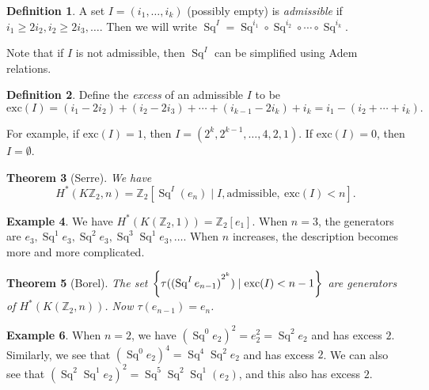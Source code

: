 \documentclass[leqno, openany]{memoir}
\newtheorem{thm}{Theorem}[section]
\theoremstyle{definition}
\newtheorem{defn}[thm]{Definition}
\newtheorem{exm}[thm]{Example}
\theoremstyle{remark}
\theoremstyle{plain}
\theoremstyle{definition}
\theoremstyle{remark}
\newcommand{\Z}{\mathbb{Z}}
\newcommand{\mr}[1]{\mathrm{#1}}
\DeclareMathOperator{\Sq}{Sq}
\begin{document}
\begin{defn}
    A set $I = (i_1, \ldots, i_k)$ (possibly empty) is \textit{admissible} if $i_1 \geq 2 i_2, i_2 \geq 2 i_3, \ldots$. Then we will write $\Sq^I = \Sq^{i_1} \circ \Sq^{i_2} \circ \cdots \circ \Sq^{i_k}$.
\end{defn}

Note that if $I$ is not admissible, then $\Sq^I$ can be simplified using Adem relations.

\begin{defn}
    Define the \textit{excess} of an admissible $I$ to be 
    \[ \mr{exc}(I) = (i_1 - 2 i_2) + (i_2 - 2 i_3) + \cdots + (i_{k-1} - 2 i_k) + i_k = i_1 - (i_2 + \cdots + i_k). \]
\end{defn}

For example, if $\mr{exc}(I) = 1$, then $I = (2^k, 2^{k-1}, \ldots, 4, 2, 1)$. If $\mr{exc}(I) = 0$, then $I = \emptyset$.

\begin{thm}[Serre]
    We have
    \[ H^*(K\Z_2, n) = \Z_2 [\Sq^I (e_n) \mid I, \text{admissible},\ \mr{exc}(I) < n]. \]
\end{thm}

\begin{exm}
    We have $H^*(K(\Z_2, 1)) = \Z_2[e_1]$. When $n=3$, the generators are $e_3, \Sq^1 e_3, \Sq^2 e_3, \Sq^3 \Sq^1 e_3, \ldots$. When $n$ increases, the description becomes more and more complicated.
\end{exm}

\begin{thm}[Borel]
    The set $\qty{\tau({(\Sq^I e_{n-1})}^{2^k}) \mid \mr{exc}(I) < n-1}$ are generators of $H^*(K(\Z_2, n))$. Now $\tau(e_{n-1}) = e_n$.
\end{thm}

\begin{exm}
    When $n = 2$, we have ${( \Sq^0 e_2 )}^2 = e_2^2 = \Sq^2 e_2$ and has excess $2$. Similarly, we see that ${(\Sq^0 e_2)}^4 = \Sq^4 \Sq^2 e_2$ and has excess $2$. We can also see that ${(\Sq^2 \Sq^1 e_2)}^2 = \Sq^5 \Sq^2 \Sq^1 (e_2)$, and this also has excess $2$.
\end{exm}
\end{document}
